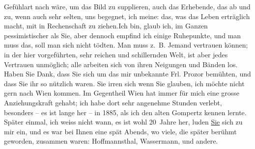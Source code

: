 \begin{ledgroupsized}[t]{13cm}
               Gefühlart nach wäre, um das Bild zu supplieren, auch das Erhebende, das ab und zu,
               wenn auch sehr selten, uns begegnet, ich meine: das, was das Leben erträglich macht,
                   mit in Rechenschaft zu ziehen.\hspace*{2em}Ich bin, glaub ich, im Ganzen pessimistischer als Sie,
               aber dennoch empfind ich einige Ruhepunkte, und man muss das, soll man sich nicht
               tödten. Man muss z. B. Jemand vertrauen können; {\pb}in der hier vorgeführten, sehr
               reichen und schillernden Welt, ist aber jedes Vertrauen unmöglich; alle arbeiten sich
               von ihren Neigungen und Bänden los.\pend
           \pstart
           Haben Sie Dank, dass Sie sich um das mir unbekannte Frl. Prozor bemühten, und dass Sie ihr so nützlich waren.\pend
           \pstart
           Sie irren sich wenn Sie glauben, ich möchte nicht gern nach Wien kommen. Im Gegentheil Wien hat immer für mich eine grosse Anziehungskraft gehabt; ich habe dort
               sehr angenehme Stunden verlebt, besonders – es ist lange her – in 1885,
               als ich den alten Gompertz kennen lernte.
               Später einmal, ich weiss nicht wann, es ist wohl 20 Jahre her, luden \uline{Sie} sich zu mir ein, und es war bei Ihnen eine \label{K_L02040-1v}\label{K_L02040-1h}
               spät Abends, wo viele, die später berühmt \strikeout{\textcolor{gray}{×}\-\textcolor{gray}{×}\-\textcolor{gray}{×}} geworden, zusammen waren: Hoffmannsthal, Wassermann, und andere.

\end{ledgroupsized}

